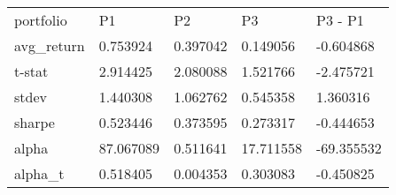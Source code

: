 \begin{tabular}{lllll}
\toprule
\midrule
portfolio & P1 & P2 & P3 & P3 - P1 \\
avg_return & 0.753924 & 0.397042 & 0.149056 & -0.604868 \\
t-stat & 2.914425 & 2.080088 & 1.521766 & -2.475721 \\
stdev & 1.440308 & 1.062762 & 0.545358 & 1.360316 \\
sharpe & 0.523446 & 0.373595 & 0.273317 & -0.444653 \\
alpha & 87.067089 & 0.511641 & 17.711558 & -69.355532 \\
alpha_t & 0.518405 & 0.004353 & 0.303083 & -0.450825 \\
\bottomrule
\end{tabular}
